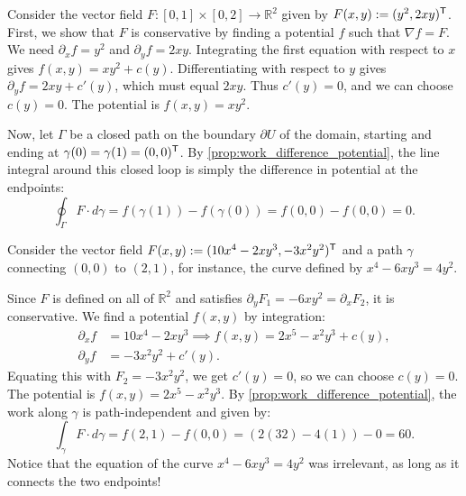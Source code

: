 \begin{example}
\label{ex:conservative_field_integral}
Consider the vector field $F : [0,1] \times [0,2] \to \mathbb{R}^2$ given by $F(x,y) := (y^2, 2xy)^{\mathsf{T}}$.
First, we show that $F$ is conservative by finding a potential $f$ such that $\nabla f = F$. We need $\partial_x f = y^2$ and $\partial_y f = 2xy$. Integrating the first equation with respect to $x$ gives $f(x,y) = xy^2 + c(y)$. Differentiating with respect to $y$ gives $\partial_y f = 2xy + c'(y)$, which must equal $2xy$. Thus $c'(y) = 0$, and we can choose $c(y) = 0$. The potential is $f(x,y) = xy^2$.

Now, let $\Gamma$ be a closed path on the boundary $\partial U$ of the domain, starting and ending at $\gamma(0) = \gamma(1) = (0,0)^{\mathsf{T}}$. By \cref{prop:work_difference_potential}, the line integral around this closed loop is simply the difference in potential at the endpoints:
\[\oint_\Gamma F \cdot d\gamma = f(\gamma(1)) - f(\gamma(0)) = f(0,0) - f(0,0) = 0.\]
\end{example}

\begin{example}
\label{ex:line_integral_potential}
Consider the vector field $F(x,y) := (10x^4 - 2xy^3, -3x^2y^2)^{\mathsf{T}}$ and a path $\gamma$ connecting $(0,0)$ to $(2,1)$, for instance, the curve defined by $x^4 - 6xy^3 = 4y^2$.

Since $F$ is defined on all of $\mathbb{R}^2$ and satisfies $\partial_y F_1 = -6xy^2 = \partial_x F_2$, it is conservative. We find a potential $f(x,y)$ by integration:
\begin{align*}
\partial_x f &= 10x^4 - 2xy^3 \implies f(x,y) = 2x^5 - x^2y^3 + c(y), \\
\partial_y f &= -3x^2y^2 + c'(y).
\end{align*}
Equating this with $F_2 = -3x^2y^2$, we get $c'(y) = 0$, so we can choose $c(y) = 0$. The potential is $f(x,y) = 2x^5 - x^2y^3$.
By \cref{prop:work_difference_potential}, the work along $\gamma$ is path-independent and given by:
\[\int_\gamma F \cdot d\gamma = f(2,1) - f(0,0) = (2(32) - 4(1)) - 0 = 60.\]
Notice that the equation of the curve $x^4 - 6xy^3 = 4y^2$ was irrelevant, as long as it connects the two endpoints!
\end{example}


